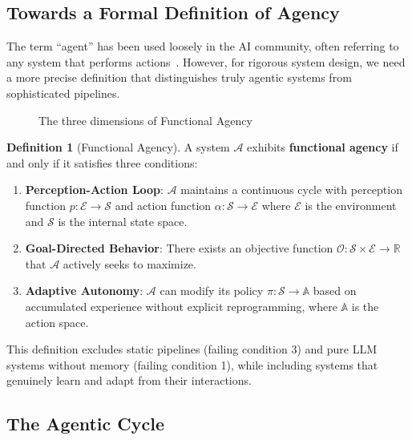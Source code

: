 \documentclass[11pt,a4paper]{article}
\theoremstyle{definition}
\newtheorem{definition}{Definition}[section]
\theoremstyle{remark}
\begin{document}
\subsection{Towards a Formal Definition of Agency}

The term ``agent'' has been used loosely in the AI community, often referring to any system that performs actions~\cite{wooldridge1995intelligent}. However, for rigorous system design, we need a more precise definition that distinguishes truly agentic systems from sophisticated pipelines.

\begin{figure}[H]
    \centering
    
    \caption{The three dimensions of Functional Agency}
    \label{fig:functional-agency}
\end{figure}

\begin{definition}[Functional Agency]
\label{def:functional-agency}
A system $\mathcal{A}$ exhibits \textbf{functional agency} if and only if it satisfies three conditions:

\begin{enumerate}
    \item \textbf{Perception-Action Loop}: $\mathcal{A}$ maintains a continuous cycle with perception function $p: \mathcal{E} \rightarrow \mathcal{S}$ and action function $\alpha: \mathcal{S} \rightarrow \mathcal{E}$ where $\mathcal{E}$ is the environment and $\mathcal{S}$ is the internal state space.

    \item \textbf{Goal-Directed Behavior}: There exists an objective function $\mathcal{O}: \mathcal{S} \times \mathcal{E} \rightarrow \mathbb{R}$ that $\mathcal{A}$ actively seeks to maximize.

    \item \textbf{Adaptive Autonomy}: $\mathcal{A}$ can modify its policy $\pi: \mathcal{S} \rightarrow \mathbb{A}$ based on accumulated experience without explicit reprogramming, where $\mathbb{A}$ is the action space.
\end{enumerate}
\end{definition}

This definition excludes static pipelines (failing condition 3) and pure LLM systems without memory (failing condition 1), while including systems that genuinely learn and adapt from their interactions.

\subsection{The Agentic Cycle}
\end{document}
